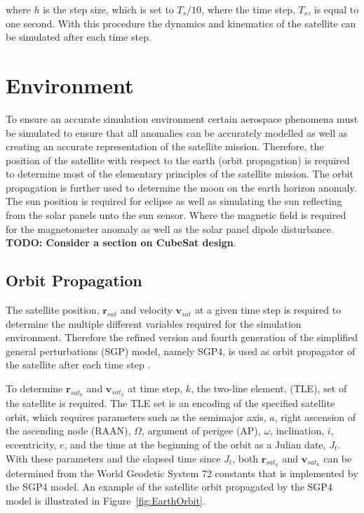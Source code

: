 where $h$ is the step size, which is set to $T_s/10$, where the time step, $T_s$, is equal to one second. With this procedure the dynamics and kinematics of the satellite can be simulated after each time step.

\section{Environment}
To ensure an accurate simulation environment certain aerospace phenomena must be simulated to ensure that all anomalies can be accurately modelled as well as creating an accurate representation of the satellite mission. Therefore, the position of the satellite with respect to the earth (orbit propagation) is required to determine most of the elementary principles of the satellite mission. The orbit propagation is further used to determine the moon on the earth horizon anomaly. The sun position is required for eclipse as well as simulating the sun reflecting from the solar panels unto the sun sensor. Where the magnetic field is required for the magnetometer anomaly as well as the solar panel dipole disturbance. \textbf{TODO: Consider a section on CubeSat design}.

\subsection{Orbit Propagation}
The satellite position, $\mathbf{r}_{sat}$ and velocity $\mathbf{v}_{sat}$ at a given time step is required to determine the multiple different variables required for the simulation environment. Therefore the refined version and fourth generation of the simplified general perturbations (SGP) model, namely SGP4, is used as orbit propagator of the satellite after each time step \cite{vallado2006revisiting}. 

To determine $\mathbf{r}_{sat_k}$ and $\mathbf{v}_{sat_k}$ at time step, $k$, the two-line element, (TLE), set of the satellite is required. The TLE set is an encoding of the specified satellite orbit, which requires parameters such as the semimajor axis, $a$, right ascension of the ascending node (RAAN), $\Omega$, argument of perigee (AP), $\omega$, inclination, $i$, eccentricity, $e$, and the time at the beginning of the orbit as a Julian date, $J_t$. With these parameters and the elapsed time since $J_t$, both $\mathbf{r}_{sat_k}$ and $\mathbf{v}_{sat_k}$ can be determined from the World Geodetic System 72 constants that is implemented by the SGP4 model. An example of the satellite orbit propagated by the SGP4 model is illustrated in Figure~\ref{fig:EarthOrbit}.

